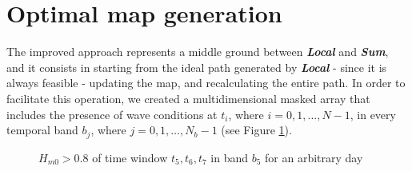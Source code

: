 \section{Optimal map generation}
The improved approach represents a middle ground between \textbf{\textit{Local}} and \textbf{\textit{Sum}}, and it consists in starting from the ideal path generated by \textbf{\textit{Local}} - since it is always feasible - updating the map, and recalculating the entire path. In order to facilitate this operation, we created a multidimensional masked array that includes the presence of wave conditions at $t_i$, where $i=0,1,\dots,N-1$, in every temporal band $b_j$, where $j=0,1,\dots,N_b-1$ (see Figure \ref{bandmap567}). 
\newpage
\begin{figure}[H]
	\centering 
	\hspace{0.1cm}
	\hspace{0.1cm}
	\vspace{0.0cm}
	\caption{$H_{m0}>0.8$ of time window $t_5, t_6, t_7$ in band $b_5$ for an arbitrary day} 
	\label{bandmap567}
\end{figure}

